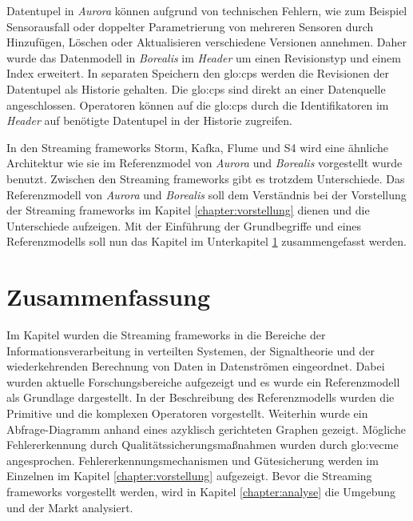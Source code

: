 Datentupel in \textit{Aurora} können aufgrund von technischen Fehlern, wie zum Beispiel Sensorausfall oder doppelter Parametrierung von mehreren Sensoren durch Hinzufügen, Löschen oder Aktualisieren verschiedene Versionen annehmen. Daher wurde das Datenmodell in \textit{Borealis} im \textit{Header} um einen Revisionstyp und einem Index erweitert. In separaten Speichern den \glspl{glo:cp} werden die Revisionen der Datentupel als Historie gehalten. Die \glspl{glo:cp} sind direkt an einer Datenquelle angeschlossen. Operatoren können auf die \glspl{glo:cp} durch die Identifikatoren im \textit{Header} auf benötigte Datentupel in der Historie zugreifen. 

In den Streaming frameworks Storm, Kafka, Flume und S4 wird eine ähnliche Architektur wie sie im Referenzmodel von \textit{Aurora} und \textit{Borealis} vorgestellt wurde benutzt. Zwischen den Streaming frameworks gibt es trotzdem Unterschiede. Das Referenzmodell von \textit{Aurora} und \textit{Borealis} soll dem Verständnis bei der Vorstellung der Streaming frameworks im Kapitel \ref{chapter:vorstellung} dienen und die Unterschiede aufzeigen. Mit der Einführung der Grundbegriffe und eines Referenzmodells soll nun das Kapitel  im Unterkapitel \ref{section:zusammenfassung} zusammengefasst werden.

\section{Zusammenfassung}
\label{section:zusammenfassung}

Im Kapitel  wurden die Streaming frameworks in die Bereiche der Informationsverarbeitung in verteilten Systemen, der Signaltheorie und der wiederkehrenden Berechnung von Daten in Datenströmen eingeordnet. Dabei wurden aktuelle Forschungsbereiche aufgezeigt und es wurde ein Referenzmodell als Grundlage dargestellt. In der Beschreibung des Referenzmodells wurden die Primitive und die komplexen Operatoren vorgestellt. Weiterhin wurde ein Abfrage-Diagramm anhand eines azyklisch gerichteten Graphen gezeigt. Mögliche Fehlererkennung durch Qualitätssicherungsmaßnahmen wurden durch \acrlong{glo:vecme} angesprochen. Fehlererkennungsmechanismen und Gütesicherung werden im Einzelnen im Kapitel \ref{chapter:vorstellung} aufgezeigt. Bevor die Streaming frameworks vorgestellt werden, wird in Kapitel \ref{chapter:analyse} die Umgebung und der Markt analysiert.